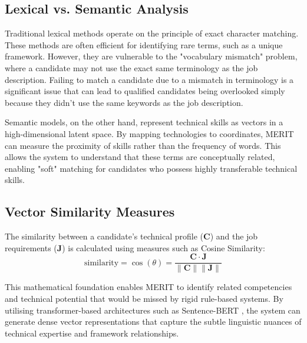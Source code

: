 \subsection*{Lexical vs. Semantic Analysis}
Traditional lexical methods operate on the principle of exact character matching. 
These methods are often efficient for identifying rare terms, such as a unique framework.
However, they are vulnerable to the "vocabulary mismatch" problem, where a candidate may not use the exact same terminology as the job description.
Failing to match a candidate due to a mismatch in terminology is a significant issue that can lead to qualified candidates being overlooked simply because they didn't use the same keywords as the job description.

Semantic models, on the other hand, represent technical skills as vectors in a high-dimensional latent space. 
By mapping technologies to coordinates, MERIT can measure the proximity of skills rather than the frequency of words. 
This allows the system to understand that these terms are conceptually related, enabling "soft" matching for candidates who possess highly transferable technical skills.

\subsection*{Vector Similarity Measures}
The similarity between a candidate's technical profile ($\mathbf{C}$) and the job requirements ($\mathbf{J}$) is calculated using measures such as Cosine Similarity:
\begin{equation} \label{eq:cosine_similarity}
    \text{similarity} = \cos(\theta) = \frac{\mathbf{C} \cdot \mathbf{J}}{\|\mathbf{C}\| \|\mathbf{J}\|}
\end{equation}

This mathematical foundation enables MERIT to identify related competencies and technical potential that would be missed by rigid rule-based systems. 
By utilising transformer-based architectures such as Sentence-BERT \cite{reimers2019sentence}, the system can generate dense vector representations that capture the subtle linguistic nuances of technical expertise and framework relationships.
